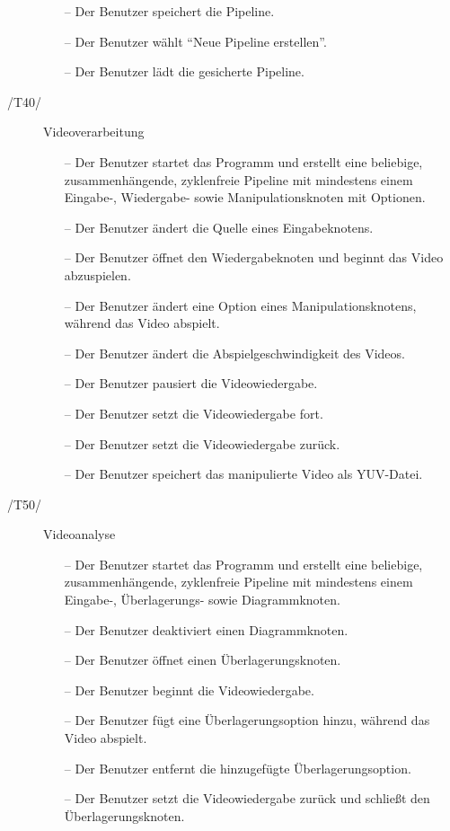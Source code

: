 \begin{description}
\begin{itemize}
			\item[--] Der Benutzer speichert die Pipeline.
			\item[--] Der Benutzer wählt ``Neue Pipeline erstellen''.
			\item[--] Der Benutzer lädt die gesicherte Pipeline.
		\end{itemize}
\newpage
	\item[/T40/] Videoverarbeitung
		\begin{itemize}
			\item[--] Der Benutzer startet das Programm und erstellt eine beliebige, zusammenhängende, zyklenfreie Pipeline mit mindestens einem Eingabe-, Wiedergabe- sowie 
				Manipulationsknoten mit Optionen.
			\item[--] Der Benutzer ändert die Quelle eines Eingabeknotens.
			\item[--] Der Benutzer öffnet den Wiedergabeknoten und beginnt das Video abzuspielen.
			\item[--] Der Benutzer ändert eine Option eines Manipulationsknotens, während das Video abspielt.
			\item[--] Der Benutzer ändert die Abspielgeschwindigkeit des Videos.
			\item[--] Der Benutzer pausiert die Videowiedergabe.
			\item[--] Der Benutzer setzt die Videowiedergabe fort.
			\item[--] Der Benutzer setzt die Videowiedergabe zurück.
			\item[--] Der Benutzer speichert das manipulierte Video als YUV-Datei.
		\end{itemize}
	\item[/T50/] Videoanalyse
		\begin{itemize}
			\item[--] Der Benutzer startet das Programm und erstellt eine beliebige, zusammenhängende, zyklenfreie Pipeline mit mindestens einem Eingabe-, Überlagerungs- sowie 
				Diagrammknoten.
			\item[--] Der Benutzer deaktiviert einen Diagrammknoten.
			\item[--] Der Benutzer öffnet einen Überlagerungsknoten.
			\item[--] Der Benutzer beginnt die Videowiedergabe.
			\item[--] Der Benutzer fügt eine Überlagerungsoption hinzu, während das Video abspielt.
			\item[--] Der Benutzer entfernt die hinzugefügte Überlagerungsoption.
			\item[--] Der Benutzer setzt die Videowiedergabe zurück und schließt den Überlagerungsknoten.

\end{itemize}
\end{description}
